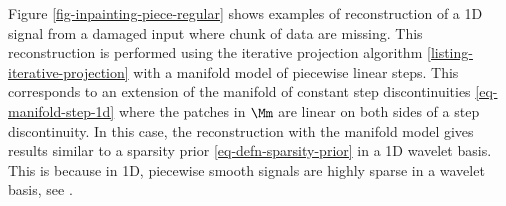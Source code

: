 


Figure \ref{fig-inpainting-piece-regular} shows examples of reconstruction of a 1D signal from a damaged input where chunk of data are missing. This reconstruction is performed using the iterative projection algorithm \ref{listing-iterative-projection} with a manifold model of piecewise linear steps. This corresponds to an extension of the manifold of constant step discontinuities \eqref{eq-manifold-step-1d} where the patches in $\Mm$ are linear on both sides of a step discontinuity. In this case, the reconstruction with the manifold model gives results similar to a sparsity prior \eqref{eq-defn-sparsity-prior} in a 1D wavelet basis. This is because in 1D, piecewise smooth signals are highly sparse in a wavelet basis, see \cite{mallat-book}.
